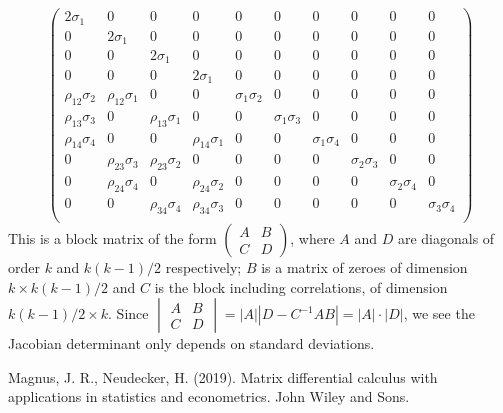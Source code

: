 \documentclass{article}
\begin{document}
$$
\begin{pmatrix}
2 \sigma_1 & 0 & 0 & 0 & 0 & 0 & 0 & 0 & 0 & 0 \\ 
0 & 2 \sigma_1 & 0 & 0 & 0 & 0 & 0 & 0 & 0 & 0 \\ 
0 & 0 & 2 \sigma_1 & 0 & 0 & 0 & 0 & 0 & 0 & 0 \\ 
0 & 0 & 0 & 2 \sigma_1 & 0 & 0 & 0 & 0 & 0 & 0 \\ 
\rho_{12} \sigma_2 & \rho_{12} \sigma_1 & 0 & 0 & \sigma_1 \sigma_2 & 0 & 0 & 0 & 0 & 0 \\
\rho_{13} \sigma_3 & 0 &\rho_{13} \sigma_1  & 0 &  0 & \sigma_1 \sigma_3 & 0 & 0 & 0 & 0 \\
\rho_{14} \sigma_4 & 0 & 0 &  \rho_{14} \sigma_1 & 0 & 0 & \sigma_1 \sigma_4 & 0 & 0 & 0  \\
0 & \rho_{23} \sigma_3 & \rho_{23} \sigma_2 & 0 & 0 & 0 & 0 & \sigma_2 \sigma_3 & 0 & 0 \\
0 & \rho_{24} \sigma_4 & 0 & \rho_{24} \sigma_2 & 0 & 0 & 0 & 0 & \sigma_2 \sigma_4 & 0 \\
0 & 0 & \rho_{34} \sigma_4 & \rho_{34} \sigma_3 & 0 & 0 & 0 & 0 & 0 & \sigma_3 \sigma_4 \\
\end{pmatrix}
$$
This is a block matrix of the form $\begin{pmatrix} A & B \\ C & D\end{pmatrix}$, where $A$ and $D$ are diagonals of order $k$ and $k(k-1)/2$ respectively; $B$ is a matrix of zeroes of dimension $k \times k(k-1)/2$ and $C$ is the block including correlations, of dimension $k(k-1)/2 \times k$. Since $\begin{vmatrix} A & B \\ C & D\end{vmatrix} = |A| |D - C^{-1}AB| = |A| \cdot |D|$,  we see the Jacobian determinant only depends on standard deviations. 

\begin{thebibliography}{6}
 Magnus, J. R., Neudecker, H. (2019). Matrix differential calculus with applications in statistics and econometrics. John Wiley and Sons.
\end{thebibliography}
\end{document}
